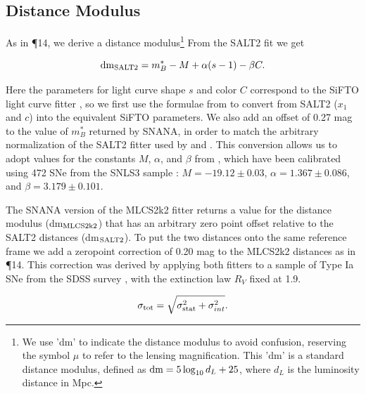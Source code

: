 \subsection{Distance Modulus}
\label{sec:DistanceModulus}

As in \P14, we derive a distance modulus\footnote{We use 'dm' to
indicate the distance modulus to avoid confusion, reserving the symbol
$\mu$ to refer to the lensing magnification. This 'dm' is a standard
distance modulus, defined as ${\rm dm}=5\log_{10}d_L+25$, where $d_L$
is the luminosity distance in Mpc.}   From the SALT2 fit
we get

\begin{equation} \label{eqn:dmSALT2}
 {\rm dm}_{\rm SALT2} = m_B^* - M + \alpha(s-1) - \beta C.
\end{equation}

\noindent  Here the parameters for light curve shape $s$ and color $C$ 
correspond to the SiFTO light curve fitter \citep{Conley:2008}, so we
first use the formulae from \citet{Guy:2010} to convert from SALT2
($x_1$ and $c$) into the equivalent SiFTO parameters.  We also add an
offset of 0.27 mag to the value of $m_B^*$ returned by SNANA, in order
to match the arbitrary normalization of the SALT2 fitter used
by \citet{Guy:2010} and \citet{Sullivan:2011}.  This conversion allows
us to adopt values for the constants $M$, $\alpha$, and $\beta$
from \citet{Sullivan:2011}, which have been calibrated using 472 SNe
from the SNLS3 sample \citep{Conley:2011}: $M=-19.12\pm0.03$,
$\alpha=1.367\pm0.086$, and $\beta=3.179\pm0.101$.



The SNANA version of the MLCS2k2 fitter returns a value for the
distance modulus (dm$_{\rm MLCS2k2}$) that has an arbitrary zero point
offset relative to the SALT2 distances (dm$_{\rm SALT2}$).  To put the
two distances onto the same reference frame we add a zeropoint
correction of 0.20 mag to the MLCS2k2 distances as
in \P14.  This correction was derived by applying both
fitters to a sample of Type Ia SNe from the SDSS
survey \citep{Holtzman:2008,Kessler:2009b}, with the extinction law
$R_V$ fixed at 1.9.


\begin{equation} \label{eqn:sigmatot}
 \sigma_{\rm tot} = \sqrt{ \sigma_{\rm stat}^2 + \sigma_{int}^2}.
\end{equation}

